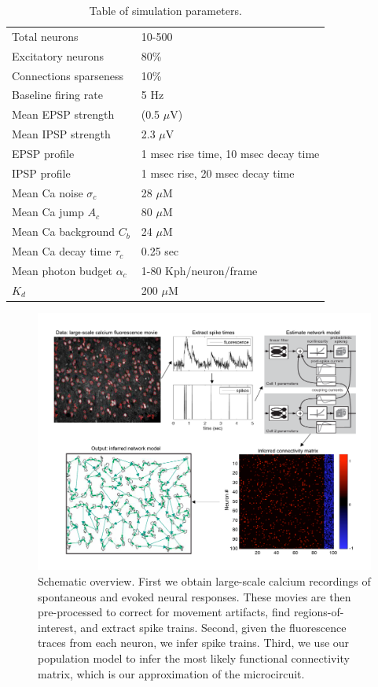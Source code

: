\begin{table}[h!b!p!]
\caption{Table of simulation parameters.}\label{table:caparm}
\begin{tabular}{ll}
\hline
Total neurons & 10-500 \\
Excitatory neurons & 80\% \\
Connections sparseness & 10\% \\
Baseline firing rate & 5  Hz\\
Mean EPSP strength & (0.5 $\mu$V) \\
Mean IPSP strength & 2.3 $\mu$V\\
EPSP profile & 1 msec rise time, 10 msec decay time \\
IPSP profile & 1 msec rise, 20 msec decay time \\
\hline
Mean Ca noise $\sigma_c$ & 28 $\mu$M \\
Mean Ca jump $A_c$ & 80 $\mu$M \\
Mean Ca background $C_b$ & 24 $\mu$M \\
Mean Ca decay time $\tau_c$ & 0.25 sec \\
Mean photon budget $\alpha_c$ & 1-80 Kph/neuron/frame \\
$K_d$ & 200 $\mu$M \\
\hline
\end{tabular}
\end{table}


\begin{figure}[h]
\centering \includegraphics[width=\hsize]{../figs/yuri-paper-schematic}
\caption{Schematic overview. First we obtain large-scale calcium recordings of spontaneous 
and evoked neural responses.  These movies are then pre-processed to correct for movement artifacts, find regions-of-interest, and extract spike trains.  Second, given the fluorescence traces from each neuron, we infer spike trains.  Third, we use our population model to infer the most likely functional connectivity matrix, which is our approximation of the microcircuit.}
\label{fig:egfluor}
\end{figure}


